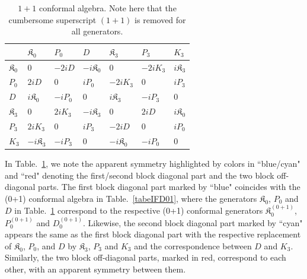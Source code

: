\documentclass[%
 reprint,
superscriptaddress,
 amsmath,amssymb,
 aps,
]{revtex4-2}
\begin{document}
\begin{table}[h!]
\centering
\setlength{\tabcolsep}{0pt} 
\caption{\label{tabelinterpolationifd}
$1+1$ conformal algebra. Note here that the cumbersome superscript $(1+1)$ is removed for all generators.}
\begin{tabular}{ |>{\centering\arraybackslash}p{1cm}||>{\centering\arraybackslash}p{1cm}|>{\centering\arraybackslash}p{1cm}|>{\centering\arraybackslash}p{1cm}|>{\centering\arraybackslash}p{1cm}|>{\centering\arraybackslash}p{1cm}|>{\centering\arraybackslash}p{1cm}| } 
 \hline
\rule{0pt}{16pt} & $\mathfrak{K}_{{0}}$   & $P_{{0}}$ &  $D$& $\mathfrak{K}_{{3}}$ & $P_{{3}}$& $K_{{3}}$\\
 \hline
  \hline
 \rule{0pt}{16pt}$\mathfrak{K}_{{0}}$ & \cellcolor{blue!20}0&\cellcolor{blue!20}$-2iD$&\cellcolor{blue!20}$-i\mathfrak{K}_{{0}}$&\cellcolor{red!20}0&\cellcolor{red!20}$-2iK_{{3}}$&\cellcolor{red!20}${i\mathfrak{K}_{{3}}}$\\
  \hline 
 \rule{0pt}{16pt}  $P_{{0}}$ &\cellcolor{blue!20}$2iD$&\cellcolor{blue!20}0&\cellcolor{blue!20}$iP_{{0}}$&\cellcolor{red!20}${-2iK_{{3}}}$&\cellcolor{red!20}0&\cellcolor{red!20}${iP_{{3}}}$\\
 \hline
 \rule{0pt}{16pt}$D$ &\cellcolor{blue!20}$i\mathfrak{K}_{{0}}$&\cellcolor{blue!20}$-iP_{{0}}$&\cellcolor{blue!20}0&\cellcolor{red!20}$i\mathfrak{K}_{{3}}$&\cellcolor{red!20}$-iP_{{3}}$&\cellcolor{red!20}0\\
 \hline
 \rule{0pt}{16pt}$\mathfrak{K}_{{3}}$ &\cellcolor{red!20}0&\cellcolor{red!20}${2iK_{{3}}}$&\cellcolor{red!20}$-i\mathfrak{K}_{{3}}$&\cellcolor{cyan!20}0&\cellcolor{cyan!20}$2iD$&\cellcolor{cyan!20}${i\mathfrak{K}_{{0}}}$\\
 \hline 
 \rule{0pt}{16pt}$P_{{3}}$ &\cellcolor{red!20}$2iK_{{3}}$&\cellcolor{red!20}0&\cellcolor{red!20}$iP_{{3}}$&\cellcolor{cyan!20}$-2iD$&\cellcolor{cyan!20}0&\cellcolor{cyan!20}${iP_{{0}}}$\\
 \hline 
 \rule{0pt}{16pt}$K_{{3}}$ &\cellcolor{red!20}${-i\mathfrak{K}_{{3}}}$&\cellcolor{red!20}${-iP_{{3}}}$&\cellcolor{red!20}0&\cellcolor{cyan!20}${-i\mathfrak{K}_{{0}}}$&\cellcolor{cyan!20}${-iP_{{0}}}$&\cellcolor{cyan!20}0\\
 \hline 
\end{tabular}
\end{table}

In Table.~\ref{tabelinterpolationifd}, we note the apparent symmetry highlighted by colors in ``blue/cyan" and ``red" denoting the first/second block diagonal part and the two block off-diagonal parts. The first block diagonal part marked by ``blue" coincides with the (0+1) conformal algebra in Table.~\ref{tabeIFD01}, where the generators $\mathfrak{K}_{{0}}$, $P_0$ and $D$ in Table.~\ref{tabelinterpolationifd} correspond to the respective (0+1) conformal generators $\mathfrak{K}^{(0+1)}_{{0}}$, $P^{(0+1)}_{0}$ and $D^{(0+1)}_{0}$. Likewise, the second block diagonal part marked by ``cyan" appears the same as the first block diagonal part with the respective replacement of $\mathfrak{K}_{{0}}$, $P_0$, and $D$ by 
$\mathfrak{K}_{{3}}$, $P_3$ and $K_3$ and the correspondence between $D$ and $K_3$. Similarly, the two block off-diagonal parts, marked in red, correspond to each other, with an apparent symmetry between them. 
\end{document}
